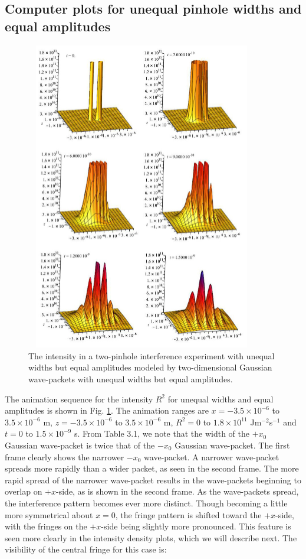 \documentclass[12pt]{article}       %
\begin{document}
\subsection{Computer plots for unequal pinhole widths and equal amplitudes}
\begin{figure}[h]
\unitlength=1in 
\hspace*{1.1in}\includegraphics[width=4in,height=5.33in]  {figure16.jpg} 
\caption{The intensity in a two-pinhole interference experiment with unequal widths but equal amplitudes modeled by two-dimensional Gaussian wave-packets with unequal widths but equal amplitudes.\label{INT2DGUW}}
\end{figure}
The animation sequence for the intensity $R^2$ for unequal widths and equal amplitudes is shown in Fig.  \ref{INT2DGUW}. The animation ranges are $x=-3.5\times 10^{-6}$ to $3.5\times 10^{-6}$ m, $z=-3.5\times 10^{-6}$ to $3.5\times 10^{-6}$ m, $R^2 = 0$ to $1.8\times 10^{11}$ Jm$^{-2}$s$^{-1}$ and $t=0$ to $1.5\times 10^{-9}$ s. From Table 3.1, we note that the width of the $+x_0$ Gaussian wave-packet is twice that of the  $-x_0$ Gaussian wave-packet. The first frame clearly shows the narrower  $-x_0$ wave-packet. A narrower wave-packet spreads more rapidly than a wider packet, as seen in the second frame. The more rapid spread of the narrower wave-packet results in the   wave-packets beginning  to overlap  on $+x$-side, as is shown in the second frame. As the wave-packets spread, the interference pattern becomes ever more distinct. Though becoming  a little more symmetrical about $x=0$, the fringe pattern is shifted  toward the $+x$-side, with the  fringes on the $+x$-side being slightly more pronounced.  This feature  is seen more clearly in the intensity density plots, which we will describe next. The visibility of the central fringe for this case is:
\end{document}
